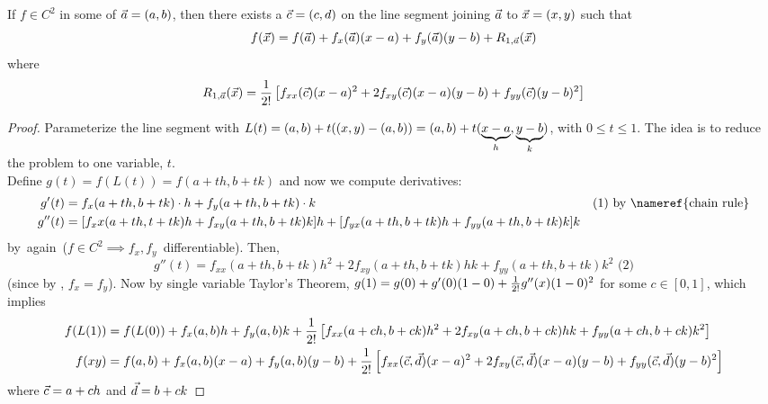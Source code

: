 \documentclass[english, 11pt]{article}
\begin{document}
\begin{thrm}\label{taylors}
If $f \in C^2$ in some  of $\vec{a} = (a,b)$, then there exists a $\vec{c} = (c,d)$ on the line segment joining $\vec{a}$ to $\vec{x} = (x,y)$ such that
\[ f(\vec{x}) = f(\vec{a}) + f_x(\vec{a})(x-a) + f_y(\vec{a})(y-b) + R_{1,\vec{a}}(\vec{x}) \]
where
\[ R_{1,\vec{a}}(\vec{x}) = \frac{1}{2!} \left[ f_{xx}(\vec{c})(x-a)^2 + 2f_{xy}(\vec{c})(x-a)(y-b) + f_{yy}(\vec{c})(y-b)^2 \right] \]
\end{thrm}
\begin{proof}
  Parameterize the line segment with $L(t) = (a,b) + t((x,y) - (a,b)) = (a,b) + t(\underbrace{x-a}_h,\underbrace{y-b}_k)$, with $0 \leq t \leq 1$. The idea is to reduce the problem to one variable, $t$. \\

  Define $g(t) = f(L(t)) = f(a+th,b+tk)$ and now we compute derivatives:
  \begin{align*}
    g'(t) & = f_x(a+th,b+tk)\cdot h + f_y(a+th,b+tk)\cdot k & \mbox{(1) by \nameref{chain rule}} \\
    g''(t) & = [f_xx(a+th,t+tk)h + f_{xy}(a+th,b+tk)k]h + [f_{yx}(a+th,b+tk)h + f_{yy}(a+th,b+tk)k]k
  \end{align*}
  \mbox{by  again ($f\in C^2 \implies f_x,f_y$ differentiable)}. Then,
  \[ g''(t) = f_{xx}(a+th,b+tk)h^2 + 2f_{xy}(a+th,b+tk)hk + f_{yy}(a+th,b+tk)k^2 \mbox{ \ \ \ \ (2)} \]
  (since by , $f_x = f_y$). Now by single variable Taylor's Theorem, $g(1) = g(0) + g'(0)(1-0) + \frac{1}{2!}g''(x)(1-0)^2$ for some $c \in [0,1]$, which implies
  \begin{align*}
    f(L(1)) & = f(L(0)) + f_x(a,b)h + f_y(a,b)k + \frac{1}{2!}\left[f_{xx}(a+ch,b+ck)h^2 + 2f_{xy}(a+ch,b+ck)hk + f_{yy}(a+ch, b+ck)k^2\right] \\
   f(xy) & = f(a,b) + f_x(a,b)(x-a) + f_y(a,b)(y-b) + \frac{1}{2!}\left[ f_{xx}(\vec{c},\vec{d})(x-a)^2 + 2f_{xy}(\vec{c},\vec{d})(x-a)(y-b) + f_{yy}(\vec{c},\vec{d})(y-b)^2 \right]
  \end{align*}
  where $\vec{c} = a + ch$ and $\vec{d} = b+ck$
\end{proof}
\end{document}
